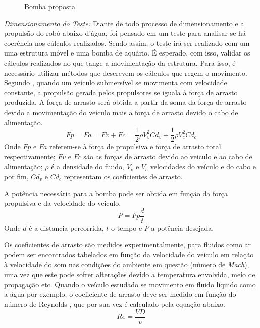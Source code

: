 \begin{description}
\begin{figure}[h]
  \caption{Bomba proposta \cite{westmarine2016}}
  \label{fig:waterbomb}
\end{figure}
\FloatBarrier
\par
\textit{Dimensionamento do Teste:} Diante de todo processo de dimensionamento
e a propulsão do robô abaixo d’água, foi pensado em um teste para analisar se
há coerência nos cálculos realizados. Sendo assim, o teste irá ser realizado
com um uma estrutura móvel e uma bomba de aquário. É esperado, com isso, validar
os cálculos realizados no que tange a movimentação da estrutura. Para isso, é
necessário utilizar métodos que descrevem os cálculos que regem o movimento. Segundo
, quando um veículo submersível se movimenta com velocidade constante,
a propulsão gerada pelos propulsores se iguala à força de arrasto produzida. A
força de arrasto será obtida a partir da soma da força de arrasto devido a 
movimentação do veículo mais a força de arrasto devido o cabo de alimentação.
\begin{displaymath}
  Fp = Fa = Fv + Fc = \frac{1}{2}\rho V^{2}_{v}Cd_{v} + \frac{1}{2}\rho V^{2}_{c}Cd_{c}
\end{displaymath}
Onde $Fp$ e $Fa$ referem-se à força de propulsiva e força de arrasto total
respectivamente; $Fv$ e $Fc$ são as forças de arrasto devido ao veiculo e ao cabo de
alimentação; $\rho$ é a densidade do fluido, $V_{v}$ e $V_{c}$ velocidades do
veículo e do cabo e por fim, $Cd_{v}$ e $Cd_{c}$ representam os coeficientes
de arrasto.
\par
A potência necessária para a bomba pode ser obtida em função da força propulsiva
e da velocidade do veiculo.
\begin{displaymath}
  P = Fp\frac{d}{t}
\end{displaymath}
Onde $d$ é a distancia percorrida, $t$ o tempo e $P$ a potência desejada.
\par
Os coeficientes de arrasto são medidos experimentalmente, para fluidos como
ar podem ser encontrados tabelados em função da velocidade do veiculo em relação
à velocidade do som nas condições do ambiente em questão (número de \textit{Mach}), uma
vez que este pode sofrer alterações devido a temperatura envolvida, meio de
propagação etc. Quando o veículo estudado se movimento em fluido líquido como a
água por exemplo, o coeficiente de arrasto deve ser medido em função do número
de Reynolds \cite{eng2008}, que por sua vez é calculado pela equação abaixo.
\begin{displaymath}
  Re = \frac{VD}{\upsilon}
\end{displaymath}

\end{description}
